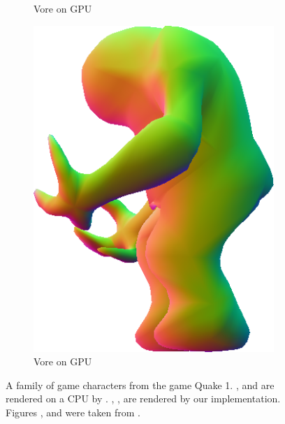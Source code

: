 \begin{figure}
\begin{subfigure}[b]{0.2\textwidth}
		\caption{Vore on GPU}
		\label{fig:results:cpugpu:gpuVore}
	\end{subfigure}	
	\hspace{0.1\textwidth}
	\begin{subfigure}[b]{0.2\textwidth}
		\centering
		\includegraphics[width=\textwidth]{content/img/results/shamblerGPU.png}
		\caption{Vore on GPU}
		\label{fig:results:cpugpu:gpuShambler}
	\end{subfigure}			
	\caption{A family of game characters from the game Quake 1. ,  and  are rendered on a CPU by \citeauthor{vlachos2001curved}. , ,  are rendered by our implementation. Figures ,  and  were taken from \textcite{vlachos2001curved}.}
	\label{fig:results:cpugpu}
\end{figure}
